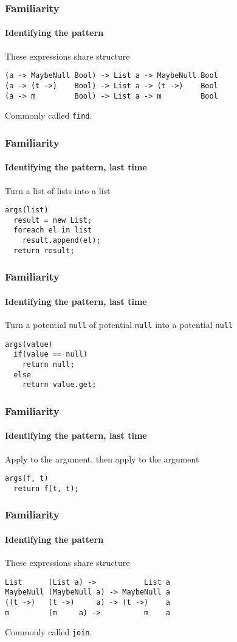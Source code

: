\begin{frame}[fragile]
\frametitle{Familiarity}
\framesubtitle{Identifying the pattern}
\begin{block}{These expressions share structure}
\begin{lstlisting}[style=language]
(a -> MaybeNull Bool) -> List a -> MaybeNull Bool
(a -> (t ->)    Bool) -> List a -> (t ->)    Bool
(a -> m         Bool) -> List a -> m         Bool
\end{lstlisting}
\end{block}
Commonly called \lstinline{find}.
\end{frame}

\begin{frame}[fragile]
\frametitle{Familiarity}
\framesubtitle{Identifying the pattern, last time}
\begin{block}{Turn a list of lists into a list}
\begin{lstlisting}[style=language]
args(list)
  result = new List;
  foreach el in list
    result.append(el);
  return result;
\end{lstlisting}
\end{block}
\end{frame}

\begin{frame}[fragile]
\frametitle{Familiarity}
\framesubtitle{Identifying the pattern, last time}
\begin{block}{Turn a potential \lstinline{null} of potential \lstinline{null} into a potential \lstinline{null}}
\begin{lstlisting}[style=language]
args(value)
  if(value == null)
    return null;
  else
    return value.get;
\end{lstlisting}
\end{block}
\end{frame}

\begin{frame}[fragile]
\frametitle{Familiarity}
\framesubtitle{Identifying the pattern, last time}
\begin{block}{Apply to the argument, then apply to the argument}
\begin{lstlisting}[style=language]
args(f, t)
  return f(t, t);
\end{lstlisting}
\end{block}
\end{frame}

\begin{frame}[fragile]
\frametitle{Familiarity}
\framesubtitle{Identifying the pattern}
\begin{block}{These expressions share structure}
\begin{lstlisting}[style=language]
List      (List a) ->           List a
MaybeNull (MaybeNull a) -> MaybeNull a
((t ->)   (t ->)     a) -> (t ->)    a
m         (m     a) ->          m    a
\end{lstlisting}
\end{block}
Commonly called \lstinline{join}.
\end{frame}
